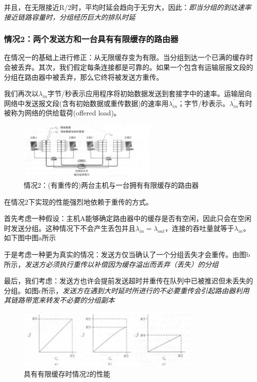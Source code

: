     并且，在无限接近R/2时，平均时延会趋向于无穷大，因此：\emph{即当分组的到达速率接近链路容量时，分组经历巨大的排队时延}

\subsubsection{情况2：两个发送方和一台具有有限缓存的路由器}

    在情况一的基础上进行修正：从无限缓存变为有限。当分组到达一个已满的缓存时会被丢弃。其次，我们假定每条连接都是可靠的。如果一个包含有运输层报文段的分组在路由器中被丢弃，那么它终将被发送方重传。

    我们再次以$\lambda_{in}$字节/秒表示应用程序将初始数据发送到套接字中的速率。运输层向网络中发送报文段(含有初始数据或重传数据)的速率用$\lambda_{in}^{'}$；字节/秒表示。$\lambda_{in}^{'}$有时被称为网络的供给载荷(offered load)。

\begin{figure}[!htbp]
    \centering
    \includegraphics[width=0.6\textwidth]{image/chapter03/拥塞情况二.png}
    \caption{情况2：(有重传的)两台主机与一台拥有有限缓存的路由器}
\end{figure}

    在情况2下实现的性能强烈地依赖于重传的方式。

    首先考虑一种假设：主机A能够确定路由器中的缓存是否有空闲，因此只会在空闲时发送分组。这种情况下不会产生丢包并且$\lambda_{in} = \lambda_{out}$，连接的吞吐量就等于$\lambda_{in}$。如下图中图a所示

    于是考虑一种更为真实的情况：发送方仅当确认了一个分组丢失才会重传。由图b所示，\emph{发送方必须执行重传以补偿因为缓存溢出而丢弃（丢失）的分组}

    最后，我们考虑：发送方也许会提前发送超时并重传在队列中已被推迟但未丢失的分组。如图c所示，\emph{发送方在遇到大时延时所进行的不必要重传会引起路由器利用其链路带宽来转发不必要的分组副本}

\begin{figure}[!htbp]
    \centering
    \includegraphics[width=0.8\textwidth]{image/chapter03/拥塞情况二吞吐量与延时等关系.png}
    \caption{具有有限缓存时情况2的性能}
\end{figure}

